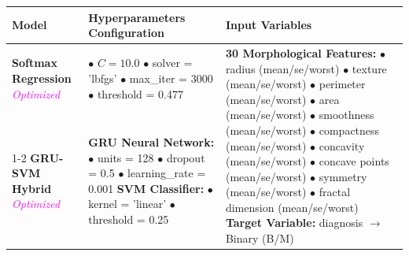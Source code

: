 \begin{table}[H]
\centering
\small
\renewcommand{\arraystretch}{1.5}
\begin{tabular}{|p{}|p{}|p{}|}
\hline
\textbf{Model} & \textbf{Hyperparameters Configuration} & \textbf{Input Variables} \\
\hline
\textbf{Softmax Regression} \newline \textit{\textcolor{magenta}{Optimized}} & 
$\bullet$ $C = 10.0$ \newline
$\bullet$ solver = 'lbfgs' \newline
$\bullet$ max\_iter = 3000 \newline
$\bullet$ threshold = 0.477 
& \multirow{3}{=}{\textbf{30 Morphological Features:} \newline
$\bullet$ radius (mean/se/worst) \newline
$\bullet$ texture (mean/se/worst) \newline
$\bullet$ perimeter (mean/se/worst) \newline
$\bullet$ area (mean/se/worst) \newline
$\bullet$ smoothness (mean/se/worst) \newline
$\bullet$ compactness (mean/se/worst) \newline
$\bullet$ concavity (mean/se/worst) \newline
$\bullet$ concave points (mean/se/worst) \newline
$\bullet$ symmetry (mean/se/worst) \newline
$\bullet$ fractal dimension (mean/se/worst) \newline
\vspace{0.2cm}
\textbf{Target Variable:} \newline
diagnosis $\rightarrow$ Binary (B/M)} \\
\cline{1-2}
\textbf{GRU-SVM Hybrid} \newline \textit{\textcolor{magenta}{Optimized}} & 
\textbf{GRU Neural Network:} \newline
$\bullet$ units = 128 \newline
$\bullet$ dropout = 0.5 \newline
$\bullet$ learning\_rate = 0.001 \newline
\vspace{0.1cm}
\textbf{SVM Classifier:} \newline
$\bullet$ kernel = 'linear' \newline
$\bullet$ threshold = 0.25 
& \\

\end{tabular}
\end{table}
